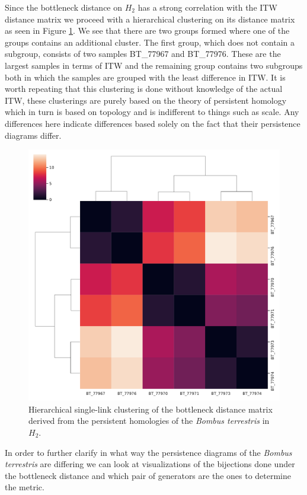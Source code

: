 Since the bottleneck distance on $H_{2}$ has a strong correlation with the ITW distance matrix we proceed with a hierarchical clustering on its distance matrix as seen in Figure \ref{h2b}. We see that there are two groups formed where one of the groups contains an additional cluster. The first group, which does not contain a subgroup, consists of two samples BT\_77967 and BT\_77976. These are the largest samples in terms of ITW and the remaining group contains two subgroups both in which the samples are grouped with the least difference in ITW. It is worth repeating that this clustering is done without knowledge of the actual ITW, these clusterings are purely based on the theory of persistent homology which in turn is based on topology and is indifferent to things such as scale. Any differences here indicate differences based solely on the fact that their persistence diagrams differ.

\begin{figure}[ht]
  \centering
  \includegraphics[scale=0.35]{clusters/bottleneck_h2_cluster.pdf}
  \caption{\label{h2b} Hierarchical single-link clustering of the bottleneck distance matrix derived from the persistent homologies of the \textit{Bombus terrestris} in $H_{2}$.}
\end{figure}

In order to further clarify in what way the persistence diagrams of the \textit{Bombus terrestris} are differing we can look at visualizations of the bijections done under the bottleneck distance and which pair of generators are the ones to determine the metric.

